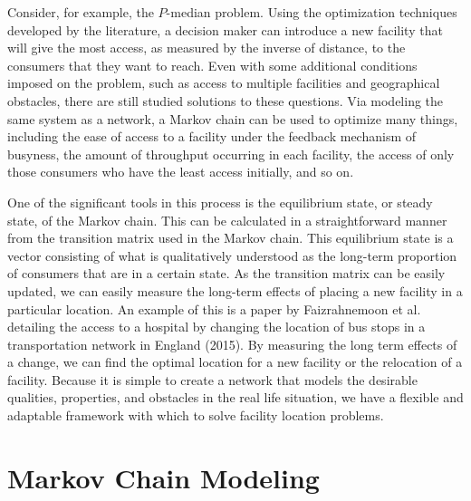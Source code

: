 \documentclass[twoside,twocolumn]{article}
\begin{document}





Consider, for example, the $P$-median problem.
Using the optimization techniques developed by the literature, a decision maker can introduce a new facility that will give the most access, as measured by the inverse of distance, to the consumers that they want to reach. %
Even with some additional conditions imposed on the problem, such as access to multiple facilities and geographical obstacles, there are still studied solutions to these questions.%
Via modeling the same system as a network, a Markov chain can be used to optimize many things, including the ease of access to a facility under the feedback mechanism of busyness, the amount of throughput occurring in each facility, the access of only those consumers who have the least access initially, and so on. %

One of the significant tools in this process is the equilibrium state, or steady state, of the Markov chain.
This can be calculated in a straightforward manner from the transition matrix used in the Markov chain.
This equilibrium state is a vector consisting of what is qualitatively understood as the long-term proportion of consumers that are in a certain state. %
As the transition matrix can be easily updated, we can easily measure the long-term effects of placing a new facility in a particular location.
An example of this is a paper by Faizrahnemoon et al. detailing the access to a hospital by changing the location of bus stops in a transportation network in England (2015).
By measuring the long term effects of a change, we can find the optimal location for a new facility or the relocation of a facility.
Because it is simple to create a network that models the desirable qualities, properties, and obstacles in the real life situation, we have a flexible and adaptable framework with which to solve facility location problems.

\section{Markov Chain Modeling}
\end{document}
